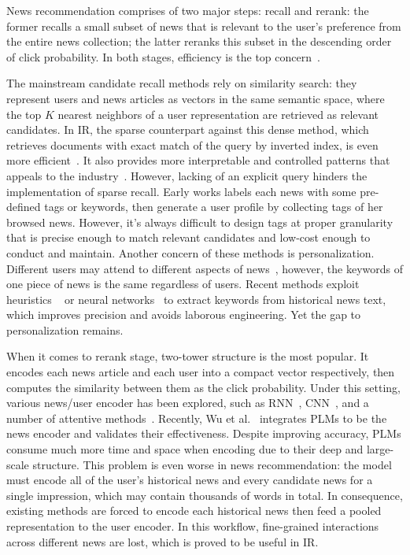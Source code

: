 \documentclass[sigconf,anonymous]{acmart}
\begin{document}
News recommendation comprises of two major steps: recall and rerank: the former recalls a small subset of news that is relevant to the user's preference from the entire news collection; the latter reranks this subset in the descending order of click probability. In both stages, efficiency is the top concern~\cite{liu_Hifi-ark,LightRec,Octopus}.

The mainstream candidate recall methods rely on similarity search: they represent users and news articles as vectors in the same semantic space, where the top $K$ nearest neighbors of a user representation are retrieved as relevant candidates. In IR, the sparse counterpart against this dense method, which retrieves documents with exact match of the query by inverted index, is even more efficient~\cite{sparse_and_dense_recall}. It also provides more interpretable and controlled patterns that appeals to the industry~\cite{COIL}. However, lacking of an explicit query hinders the implementation of sparse recall.
Early works labels each news with some pre-defined tags or keywords, then generate a user profile by collecting tags of her browsed news. However, it's always difficult to design tags at proper granularity that is precise enough to match relevant candidates and low-cost enough to conduct and maintain. Another concern of these methods is personalization. Different users may attend to different aspects of news~\cite{liu_Octopus}, however, the keywords of one piece of news is the same regardless of users. Recent methods exploit heuristics ~\cite{BM25} or neural networks~\cite{} to extract keywords from historical news text, which improves precision and avoids laborous engineering. Yet the gap to personalization remains.

When it comes to rerank stage, two-tower structure is the most popular. It encodes each news article and each user into a compact vector respectively, then computes the similarity between them as the click probability. Under this setting, various news/user encoder has been explored, such as RNN~\cite{lian_DFM}, CNN~\cite{wu_NAML}, and a number of attentive methods~\cite{wu_NRMS, NPA, NAML}.
Recently, Wu et al.~\cite{wu_newsPLM} integrates PLMs to be the news encoder and validates their effectiveness. Despite improving accuracy, PLMs consume much more time and space when encoding due to their deep and large-scale structure. This problem is even worse in news recommendation: the model must encode all of the user's historical news and every candidate news for a single impression, which may contain thousands of words in total. In consequence, existing methods are forced to encode each historical news then feed a pooled representation  to the user encoder. In this workflow, fine-grained interactions across different news are lost, which is proved to be useful in IR.~\cite{PolyEncoder}
\end{document}
